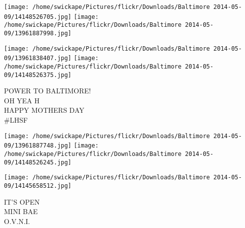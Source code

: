 \documentclass[10pt,letterpaper]{article}
\begin{document}
\texttt{[image: /home/swickape/Pictures/flickr/Downloads/Baltimore 2014-05-09/14148526705.jpg]}
\texttt{[image: /home/swickape/Pictures/flickr/Downloads/Baltimore 2014-05-09/13961887998.jpg]}

\texttt{[image: /home/swickape/Pictures/flickr/Downloads/Baltimore 2014-05-09/13961838407.jpg]}
\texttt{[image: /home/swickape/Pictures/flickr/Downloads/Baltimore 2014-05-09/14148526375.jpg]}

POWER TO BALTIMORE!\\
OH YEA H\\
HAPPY MOTHERS DAY\\
\#LHSF\\
\pagebreak

\texttt{[image: /home/swickape/Pictures/flickr/Downloads/Baltimore 2014-05-09/13961887748.jpg]}
\texttt{[image: /home/swickape/Pictures/flickr/Downloads/Baltimore 2014-05-09/14148526245.jpg]}

\texttt{[image: /home/swickape/Pictures/flickr/Downloads/Baltimore 2014-05-09/14145658512.jpg]}

IT'S OPEN\\
MINI BAE\\
O.V.N.I.\\
\pagebreak
\end{document}
